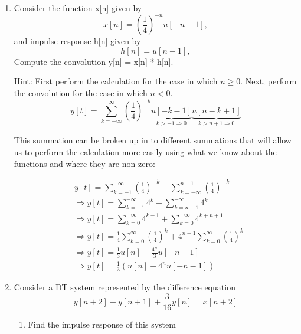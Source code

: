 \documentclass{article}
\begin{document}
\begin{enumerate}
    \item Consider the function x[n] given by
    \begin{equation}
        x[n] = \left(\frac{1}{4}\right)^{-n}u[-n-1],
    \end{equation}
    and impulse response h[n] given by
    \begin{equation}
        h[n] = u[n-1],
    \end{equation}
    Compute the convolution y[n] = x[n] * h[n].
    
    Hint: First perform the calculation for the case in which $n \geq 0$. Next, perform the convolution for the case in which $n < 0$.
    \begin{equation}
        y[t] = \sum_{k=-\infty}^{\infty} \left(\frac{1}{4}\right)^{-k}\underbrace{u[-k-1]}_{k>-1\Rightarrow0}\underbrace{u[n-k+1]}_{k>n+1\Rightarrow0}
    \end{equation}
    \begin{center}
        This summation can be broken up in to different summations that will allow us to perform the calculation more easily using what we know about the functions and where they are non-zero:
    \end{center}
    \begin{align}
        &y[t] = \sum_{k=-1}^{-\infty} \left(\frac{1}{4}\right)^{-k} + \sum_{k=-\infty}^{n-1} \left(\frac{1}{4}\right)^{-k}\\
        &\Rightarrow y[t] = \sum_{k=-1}^{-\infty}  4^{k}+ \sum_{k=n-1}^{-\infty} 4^{k}\\
        &\Rightarrow y[t] = \sum_{k=0}^{-\infty}  4^{k-1}+ \sum_{k=0}^{-\infty} 4^{k+n+1}\\
        &\Rightarrow y[t] = \frac{1}{4}\sum_{k=0}^{\infty}  \left(\frac{1}{4}\right)^{k}+ 4^{n-1}\sum_{k=0}^{\infty} \left(\frac{1}{4}\right)^{k}\\
        &\Rightarrow y[t] = \frac{1}{3}u[n]+\frac{4^n}{3}u[-n-1]\\
        &\Rightarrow \boxed{y[t] = \frac{1}{3}\left(u[n]+4^nu[-n-1]\right)}
    \end{align}
    \newpage
    \item Consider a DT system represented by the difference equation
    \begin{equation}
        y[n+2] + y[n+1] +\frac{3}{16}y[n] = x[n+2]
    \end{equation}
    \begin{enumerate}
        \item Find the impulse response of this system

\end{enumerate}
\end{enumerate}
\end{document}
